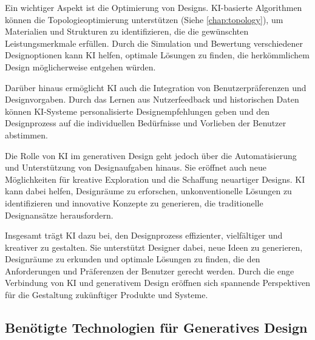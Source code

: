 Ein wichtiger Aspekt ist die Optimierung von Designs. KI-basierte Algorithmen können die Topologieoptimierung unterstützen (Siehe \autoref{chap:topology}), um Materialien und Strukturen zu identifizieren, die die gewünschten Leistungsmerkmale erfüllen. Durch die Simulation und Bewertung verschiedener Designoptionen kann KI helfen, optimale Lösungen zu finden, die herkömmlichem Design möglicherweise entgehen würden.

Darüber hinaus ermöglicht KI auch die Integration von Benutzerpräferenzen und Designvorgaben. Durch das Lernen aus Nutzerfeedback und historischen Daten können KI-Systeme personalisierte Designempfehlungen geben und den Designprozess auf die individuellen Bedürfnisse und Vorlieben der Benutzer abstimmen.

Die Rolle von KI im generativen Design geht jedoch über die Automatisierung und Unterstützung von Designaufgaben hinaus. Sie eröffnet auch neue Möglichkeiten für kreative Exploration und die Schaffung neuartiger Designs. KI kann dabei helfen, Designräume zu erforschen, unkonventionelle Lösungen zu identifizieren und innovative Konzepte zu generieren, die traditionelle Designansätze herausfordern.

Insgesamt trägt KI dazu bei, den Designprozess effizienter, vielfältiger und kreativer zu gestalten. Sie unterstützt Designer dabei, neue Ideen zu generieren, Designräume zu erkunden und optimale Lösungen zu finden, die den Anforderungen und Präferenzen der Benutzer gerecht werden. Durch die enge Verbindung von KI und generativem Design eröffnen sich spannende Perspektiven für die Gestaltung zukünftiger Produkte und Systeme. \autocite*{21} \autocite*{22}

\subsection*{Benötigte Technologien für Generatives Design}